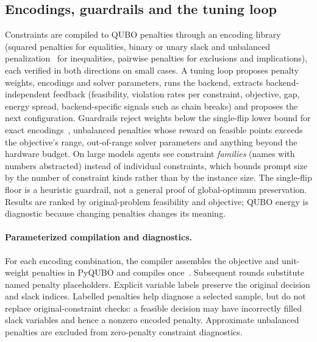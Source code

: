 \subsection{Encodings, guardrails and the tuning loop}
Constraints are compiled to QUBO penalties through an encoding library (squared penalties for equalities, binary
or unary slack and unbalanced penalization~\citep{montanez2024unbalanced} for inequalities, pairwise penalties for
exclusions and implications), each verified in both directions on small cases. A tuning loop proposes penalty
weights, encodings and solver parameters, runs the backend, extracts backend-independent feedback (feasibility,
violation rates per constraint, objective, gap, energy spread, backend-specific signals such as chain breaks) and
proposes the next configuration. Guardrails reject weights below the single-flip lower bound for exact
encodings~\citep{verma2020penalty}, unbalanced penalties whose reward on feasible points exceeds the objective's
range, out-of-range solver parameters and anything beyond the hardware budget. On large models agents see
constraint \emph{families} (names with numbers abstracted) instead of individual constraints, which bounds prompt
size by the number of constraint kinds rather than by the instance size. The single-flip floor is a heuristic
guardrail, not a general proof of global-optimum preservation. Results are ranked by original-problem
feasibility and objective; QUBO energy is diagnostic because changing penalties changes its meaning.

\paragraph{Parameterized compilation and diagnostics.}
For each encoding combination, the compiler assembles the objective and unit-weight penalties in PyQUBO and
compiles once~\citep{pyquboDocs}. Subsequent rounds substitute named penalty placeholders. Explicit variable
labels preserve the original decision and slack indices. Labelled penalties help diagnose a selected sample,
but do not replace original-constraint checks: a feasible decision may have incorrectly filled slack variables
and hence a nonzero encoded penalty. Approximate unbalanced penalties are excluded from zero-penalty
constraint diagnostics.

